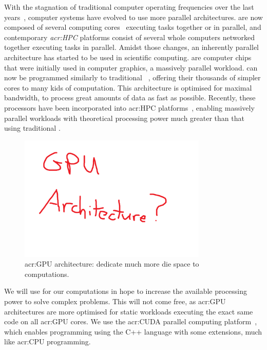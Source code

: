 With the stagnation of traditional computer \textit{} operating frequencies over
the last years~\cite{Parkhurst2006}, computer systems have evolved to use more parallel
architectures.  are now composed of several computing cores~\cite{Nayfeh1997}
executing tasks together or in parallel, and contemporary \textit{\acrfull{acr:HPC}} platforms
consist of several whole computers networked together executing tasks in parallel. Amidst those
changes, an inherently parallel architecture has started to be used in scientific computing.
\textit{} are computer chips that were initially used in computer graphics, a
massively parallel workload.  can now be programmed similarly to traditional
~\cite{Owens2008}, offering their thousands of simpler cores to many kids of
computation. This architecture is optimised for maximal bandwidth, to process great amounts of data
as fast as possible. Recently, these processors have been incorporated into \acrshort{acr:HPC}
platforms~\cite{Fan2004}, enabling massively parallel workloads with theoretical processing power
much greater than that using traditional .

\begin{figure}[H]
	\centering
	\includegraphics[width=0.8\textwidth]{Chapter_introduction/media/graphics_processing_unit}
	\caption{\Acrshort{acr:GPU} architecture:  dedicate much more die space to computations.}\label{fig:intro_gpu}
\end{figure}

We will use  for our computations in hope to increase the available processing
power to solve complex problems. This will not come free, as \acrshort{acr:GPU} architectures are
more optimised for static workloads executing the exact same code on all \acrshort{acr:GPU} cores.
We use the \acrshort{acr:CUDA} parallel computing platform~\cite{Garland2008}, which enables
programming  using the C++ language with some extensions, much like
\acrshort{acr:CPU} programming.

